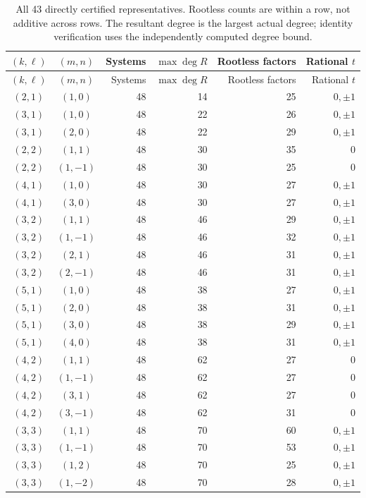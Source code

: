 \documentclass[11pt,letterpaper]{article}
\theoremstyle{definition}\newtheorem{definition}[theorem]{Definition}
\theoremstyle{remark}\newtheorem{remark}[theorem]{Remark}
\begin{document}
\begin{longtable}{ccrrrr}
\caption{All 43 directly certified representatives. Rootless counts are within a row, not additive across rows. The resultant degree is the largest actual degree; identity verification uses the independently computed degree bound.}\label{tab:two}\\
\toprule
$(k,\ell)$ & $(m,n)$ & Systems & $\max\deg R$ & Rootless factors & Rational $t$\\
\midrule\endfirsthead
\toprule
$(k,\ell)$ & $(m,n)$ & Systems & $\max\deg R$ & Rootless factors & Rational $t$\\
\midrule\endhead
$(2,1)$ & $(1,0)$ & 48 & 14 & 25 & $0,\pm1$ \\
$(3,1)$ & $(1,0)$ & 48 & 22 & 26 & $0,\pm1$ \\
$(3,1)$ & $(2,0)$ & 48 & 22 & 29 & $0,\pm1$ \\
$(2,2)$ & $(1,1)$ & 48 & 30 & 35 & $0$ \\
$(2,2)$ & $(1,-1)$ & 48 & 30 & 25 & $0$ \\
$(4,1)$ & $(1,0)$ & 48 & 30 & 27 & $0,\pm1$ \\
$(4,1)$ & $(3,0)$ & 48 & 30 & 27 & $0,\pm1$ \\
$(3,2)$ & $(1,1)$ & 48 & 46 & 29 & $0,\pm1$ \\
$(3,2)$ & $(1,-1)$ & 48 & 46 & 32 & $0,\pm1$ \\
$(3,2)$ & $(2,1)$ & 48 & 46 & 31 & $0,\pm1$ \\
$(3,2)$ & $(2,-1)$ & 48 & 46 & 31 & $0,\pm1$ \\
$(5,1)$ & $(1,0)$ & 48 & 38 & 27 & $0,\pm1$ \\
$(5,1)$ & $(2,0)$ & 48 & 38 & 31 & $0,\pm1$ \\
$(5,1)$ & $(3,0)$ & 48 & 38 & 29 & $0,\pm1$ \\
$(5,1)$ & $(4,0)$ & 48 & 38 & 31 & $0,\pm1$ \\
$(4,2)$ & $(1,1)$ & 48 & 62 & 27 & $0$ \\
$(4,2)$ & $(1,-1)$ & 48 & 62 & 27 & $0$ \\
$(4,2)$ & $(3,1)$ & 48 & 62 & 27 & $0$ \\
$(4,2)$ & $(3,-1)$ & 48 & 62 & 31 & $0$ \\
$(3,3)$ & $(1,1)$ & 48 & 70 & 60 & $0,\pm1$ \\
$(3,3)$ & $(1,-1)$ & 48 & 70 & 53 & $0,\pm1$ \\
$(3,3)$ & $(1,2)$ & 48 & 70 & 25 & $0,\pm1$ \\
$(3,3)$ & $(1,-2)$ & 48 & 70 & 28 & $0,\pm1$ \\

\end{longtable}
\end{document}
